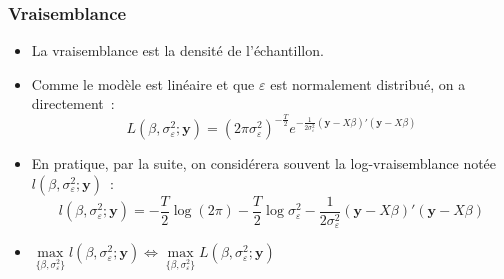 \documentclass[10pt]{beamer}
\theoremstyle{plain}
\begin{document}
\begin{frame}
  \frametitle{Vraisemblance}

  \begin{itemize}

  \item La vraisemblance est la densité de l'échantillon.\newline

  \item Comme le modèle est linéaire et que $\varepsilon$ est normalement distribué, on a directement~:
    \[
      L(\beta, \sigma_{\varepsilon}^2; \mathbf y) = (2\pi\sigma_{\varepsilon}^2)^{-\frac{T}{2}}e^{-\frac{1}{2\sigma_{\varepsilon}^2}(\mathbf y - X\beta)'(\mathbf y - X\beta)}
    \]
    \medskip

  \item En pratique, par la suite, on considérera souvent la log-vraisemblance notée $l(\beta, \sigma_{\varepsilon}^2; \mathbf y)$~:
    \[
      l(\beta, \sigma_{\varepsilon}^2; \mathbf y) = -\frac{T}{2}\log(2\pi) -\frac{T}{2}\log\sigma_{\varepsilon}^2 - \frac{1}{2\sigma_{\varepsilon}^2}(\mathbf y - X\beta)'(\mathbf y - X\beta)
    \]
    \medskip

  \item $\underset{\{\beta, \sigma_{\varepsilon}^2\}}{\max} l(\beta, \sigma_{\varepsilon}^2; \mathbf y) \Leftrightarrow \underset{\{\beta, \sigma_{\varepsilon}^2\}}{\max} L(\beta, \sigma_{\varepsilon}^2; \mathbf y)$

  \end{itemize}

\end{frame}
\end{document}
